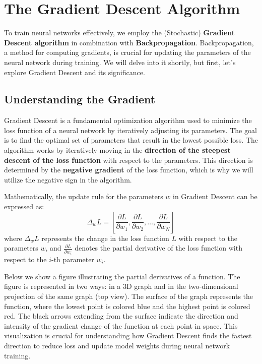 \section{The Gradient Descent Algorithm}

\vspace{-0.4cm}
To train neural networks effectively, we employ the (Stochastic) \textbf{Gradient Descent algorithm} in combination with \textbf{Backpropagation}. Backpropagation, a method for computing gradients, is crucial for updating the parameters of the neural network during training. We will delve into it shortly, but first, let's explore Gradient Descent and its significance.
\vspace{-0.4cm}

\subsection{Understanding the Gradient}

Gradient Descent is a fundamental optimization algorithm used to minimize the loss function of a neural network by iteratively adjusting its parameters. The goal is to find the optimal set of parameters that result in the lowest possible loss. The algorithm works by iteratively moving in the \textbf{direction of the steepest descent of the loss function} with respect to the parameters. This direction is determined by the \textbf{negative gradient} of the loss function, which is why we will utilize the negative sign in the algorithm.

Mathematically, the update rule for the parameters \( w \) in Gradient Descent can be expressed as:
$$
\Delta_w L = \left[ \frac{\partial L}{\partial w_1}, \frac{\partial L}{\partial w_2}, \ldots , \frac{\partial L}{\partial w_N}\right]
$$
where \( \Delta_w L \) represents the change in the loss function \( L \) with respect to the parameters \( w \), and \( \frac{\partial L}{\partial w_i} \) denotes the partial derivative of the loss function with respect to the \( i \)-th parameter \( w_i \).

Below we show a figure illustrating the partial derivatives of a function. The figure is represented in two ways: in a 3D graph and in the two-dimensional projection of the same graph (top view). The surface of the graph represents the function, where the lowest point is colored blue and the highest point is colored red. The black arrows extending from the surface indicate the direction and intensity of the gradient change of the function at each point in space. This visualization is crucial for understanding how Gradient Descent finds the fastest direction to reduce loss and update model weights during neural network training.

